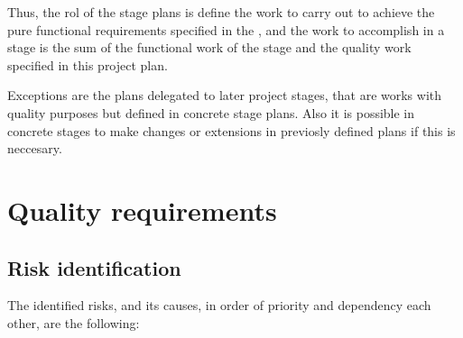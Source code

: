 \documentclass[twocolumn, 9pt]{extarticle}
\begin{document}
Thus, the rol of the stage plans is define the work to carry out to
achieve the pure functional requirements specified in the \favc, and
the work to accomplish in a stage is the sum of the functional work of
the stage and the quality work specified in this project plan.

Exceptions are the plans delegated to later project stages, that
are works with quality purposes but defined in concrete stage
plans. Also it is possible in concrete stages to make changes or
extensions in previosly defined plans if this is neccesary.

\section{Quality requirements}
\label{sec:quality-requirements}

\subsection{Risk identification}
\label{ssec:risks-identification}
The identified risks, and its causes, in order of priority and dependency
each other, are the following:
\end{document}
